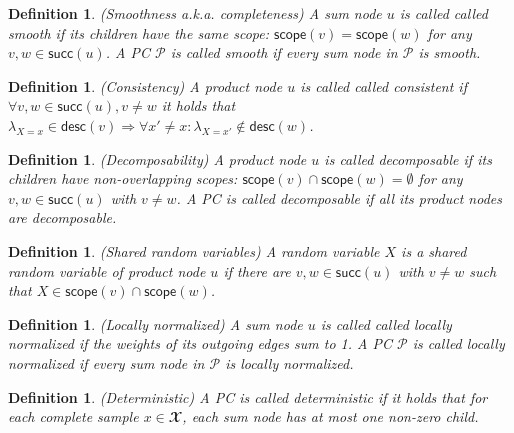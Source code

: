 \documentclass{article}
\newtheorem{definition}[theorem]{Definition}
\newcommand{\func}[1]{\ensuremath{\textsf{#1}}} %
\begin{document}

\begin{definition}(Smoothness a.k.a. completeness) A sum node $u$ is called called \emph{smooth} if its children have the same scope: $\func{scope}(v) = \func{scope}(w)$ for any $v, w \in \func{succ}(u)$. A PC $\mathcal{P}$ is called smooth if every sum node in $\mathcal{P}$ is smooth.
\end{definition}

\begin{definition}(Consistency) A product node $u$ is called called \emph{consistent} if 
$\forall v, w \in \func{succ}(u), v \neq w$ it holds that
$\lambda_{X=x} \in \func{desc}(v) \Rightarrow \forall x' \neq x: \lambda_{X=x'} \notin \func{desc}(w)$.
\end{definition}

\begin{definition}(Decomposability) A product node $u$ is called \emph{decomposable} if its children have non-overlapping scopes: $\func{scope}(v) \cap \func{scope}(w) = \emptyset$ for any $v, w \in \func{succ}(u)$ with $v \neq w$. A PC is called decomposable if all its product nodes are decomposable.
\end{definition}

\begin{definition}(Shared random variables) A random variable $X$ is a \emph{shared} random variable of product node $u$ if there are $v,w \in \func{succ}(u)$ with $v \neq w$ such that $X \in \func{scope}(v) \cap \func{scope}(w)$.
\end{definition}

\begin{definition}(Locally normalized) A sum node $u$ is called called \emph{locally normalized} if the weights of its outgoing edges sum to 1. A PC $\mathcal{P}$ is called locally normalized if every sum node in $\mathcal{P}$ is locally normalized.
\end{definition}

\begin{definition}(Deterministic) A PC is called \emph{deterministic} if it holds that for each complete sample $x \in \mathbfcal{X}$, each sum node has at most one non-zero child.
\end{definition}
\end{document}
